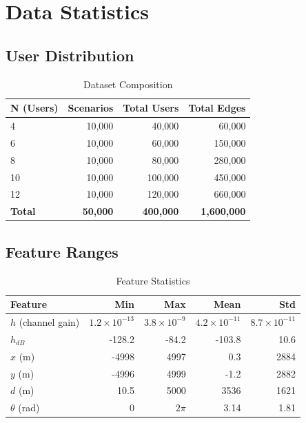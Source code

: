 \section{Data Statistics}

\subsection{User Distribution}

\begin{table}[H]
\centering
\begin{tabular}{lrrr}
\toprule
\textbf{N (Users)} & \textbf{Scenarios} & \textbf{Total Users} & \textbf{Total Edges} \\
\midrule
4 & 10,000 & 40,000 & 60,000 \\
6 & 10,000 & 60,000 & 150,000 \\
8 & 10,000 & 80,000 & 280,000 \\
10 & 10,000 & 100,000 & 450,000 \\
12 & 10,000 & 120,000 & 660,000 \\
\midrule
\textbf{Total} & \textbf{50,000} & \textbf{400,000} & \textbf{1,600,000} \\
\bottomrule
\end{tabular}
\caption{Dataset Composition}
\end{table}

\subsection{Feature Ranges}

\begin{table}[H]
\centering
\begin{tabular}{lrrrr}
\toprule
\textbf{Feature} & \textbf{Min} & \textbf{Max} & \textbf{Mean} & \textbf{Std} \\
\midrule
$h$ (channel gain) & $1.2 \times 10^{-13}$ & $3.8 \times 10^{-9}$ & $4.2 \times 10^{-11}$ & $8.7 \times 10^{-11}$ \\
$h_{dB}$ & -128.2 & -84.2 & -103.8 & 10.6 \\
$x$ (m) & -4998 & 4997 & 0.3 & 2884 \\
$y$ (m) & -4996 & 4999 & -1.2 & 2882 \\
$d$ (m) & 10.5 & 5000 & 3536 & 1621 \\
$\theta$ (rad) & 0 & $2\pi$ & 3.14 & 1.81 \\
\bottomrule
\end{tabular}
\caption{Feature Statistics}
\end{table}

